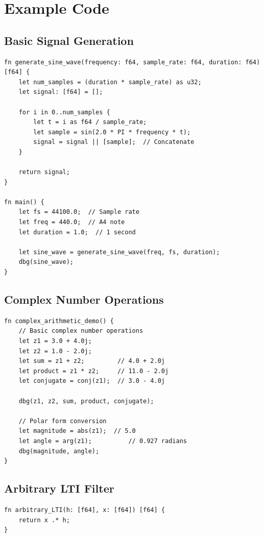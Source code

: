 \pagebreak
\section{Example Code}

\subsection{Basic Signal Generation}

\begin{verbatim}
fn generate_sine_wave(frequency: f64, sample_rate: f64, duration: f64) [f64] {
    let num_samples = (duration * sample_rate) as u32;
    let signal: [f64] = [];
    
    for i in 0..num_samples {
        let t = i as f64 / sample_rate;
        let sample = sin(2.0 * PI * frequency * t);
        signal = signal || [sample];  // Concatenate
    }
    
    return signal;
}

fn main() {
    let fs = 44100.0;  // Sample rate
    let freq = 440.0;  // A4 note
    let duration = 1.0;  // 1 second
    
    let sine_wave = generate_sine_wave(freq, fs, duration);
    dbg(sine_wave);
}
\end{verbatim}

\subsection{Complex Number Operations}

\begin{verbatim}
fn complex_arithmetic_demo() {
    // Basic complex number operations
    let z1 = 3.0 + 4.0j;
    let z2 = 1.0 - 2.0j;
    let sum = z1 + z2;         // 4.0 + 2.0j
    let product = z1 * z2;     // 11.0 - 2.0j
    let conjugate = conj(z1);  // 3.0 - 4.0j
    
    dbg(z1, z2, sum, product, conjugate);
    
    // Polar form conversion
    let magnitude = abs(z1);  // 5.0
    let angle = arg(z1);          // 0.927 radians
    dbg(magnitude, angle);
}
\end{verbatim}
\subsection{Arbitrary LTI Filter}
\begin{verbatim}
fn arbitrary_LTI(h: [f64], x: [f64]) [f64] {
    return x .* h;
}
\end{verbatim}
